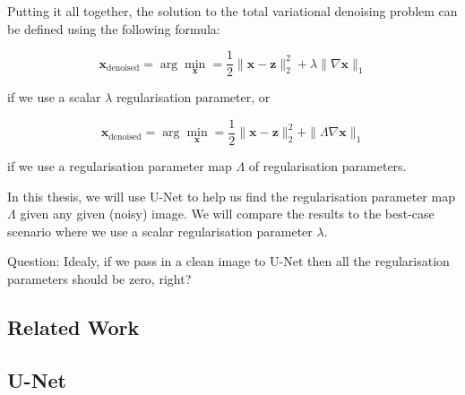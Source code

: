 \documentclass[12pt]{article}
\begin{document}
Putting it all together, 
the solution to the total variational denoising problem
can be 
defined
using the following formula:

\begin{equation}
  \mathbf{x}_{\text{denoised}} = \arg \min_{\mathbf{x}}  = \frac{1}{2} \|\mathbf{x} - \mathbf{z}\|_2^2 + \lambda \| \nabla \mathbf{x} \|_1
\end{equation}

if we use a scalar $\lambda$ regularisation parameter, or

\begin{equation}
  \mathbf{x}_{\text{denoised}} = \arg \min_{\mathbf{x}}  = \frac{1}{2} \|\mathbf{x} - \mathbf{z}\|_2^2 + \| \Lambda \nabla \mathbf{x} \|_1
\end{equation}

if we use a regularisation parameter map $\Lambda$ of regularisation parameters.

In this thesis, we will use
U-Net to help us find the regularisation parameter map $\Lambda$ 
given any given (noisy) image. 
We will compare the results to the best-case scenario where we use a scalar regularisation parameter $\lambda$.

Question: Idealy, if we pass in a clean image to U-Net then all the regularisation parameters should be zero, right?






\subsection{Related Work}





\subsection{U-Net}
\end{document}
